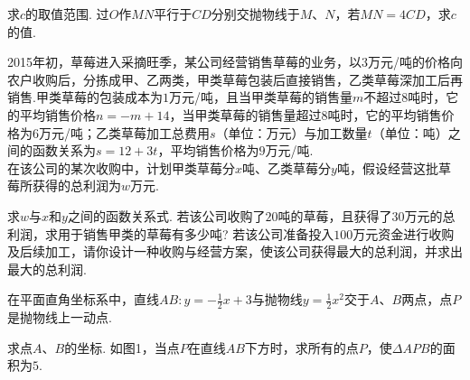 \documentclass[10pt]{article}
\begin{document}
\begin{questions}{\answeringintroduction}
\begin{subquestions}
        \subquestion 求$c$的取值范围.
        \subquestion 过$O$作$MN$平行于$CD$分别交抛物线于$M$、$N$，若$MN = 4CD$，求$c$的值.
    \end{subquestions}
    \begin{figure}[!htb]
        \raggedleft
    \end{figure}
    \question 2015年初，草莓进入采摘旺季，某公司经营销售草莓的业务，以$3$万元/吨的价格向农户收购后，分拣成甲、乙两类，甲类草莓包装后直接销售，乙类草莓深加工后再销售.甲类草莓的包装成本为$1$万元/吨，且当甲类草莓的销售量$m$不超过$8$吨时，它的平均销售价格$n = - m + 14$，当甲类草莓的销售量超过$8$吨时，它的平均销售价格为$6$万元/吨；乙类草莓加工总费用$s$（单位：万元）与加工数量$t$（单位：吨）之间的函数关系为$s = 12 + 3t$，平均销售价格为$9$万元/吨. \\
    在该公司的某次收购中，计划甲类草莓分$x$吨、乙类草莓分$y$吨，假设经营这批草莓所获得的总利润为$w$万元.
    \begin{subquestions}
        \subquestion 求$w$与$x$和$y$之间的函数关系式.
        \subquestion 若该公司收购了$20$吨的草莓，且获得了$30$万元的总利润，求用于销售甲类的草莓有多少吨?
        \subquestion 若该公司准备投入$100$万元资金进行收购及后续加工，请你设计一种收购与经营方案，使该公司获得最大的总利润，并求出最大的总利润.
    \end{subquestions}
    \newpage
    \question 在平面直角坐标系中，直线$AB:y=-\frac{1}{2}x+3$与抛物线$y=\frac{1}{2}x^2$交于$A$、$B$两点，点$P$是抛物线上一动点.
    \begin{subquestions}
        \subquestion 求点$A$、$B$的坐标.
        \subquestion 如图1，当点$P$在直线$AB$下方时，求所有的点$P$，使$\Delta APB$的面积为$5$.

\end{subquestions}
\end{questions}
\end{document}
